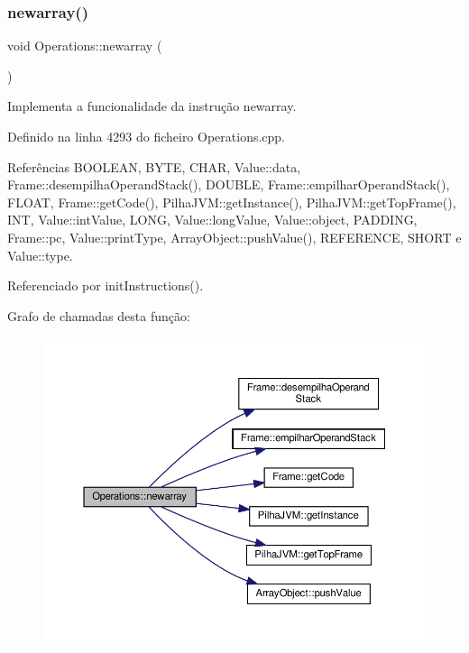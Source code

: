 \subsubsection{\texorpdfstring{newarray()}{newarray()}}
{\footnotesize\ttfamily void Operations\+::newarray (\begin{DoxyParamCaption}{ }\end{DoxyParamCaption})\hspace{0.3cm}{\ttfamily [private]}}



Implementa a funcionalidade da instrução newarray. 



Definido na linha 4293 do ficheiro Operations.\+cpp.



Referências B\+O\+O\+L\+E\+AN, B\+Y\+TE, C\+H\+AR, Value\+::data, Frame\+::desempilha\+Operand\+Stack(), D\+O\+U\+B\+LE, Frame\+::empilhar\+Operand\+Stack(), F\+L\+O\+AT, Frame\+::get\+Code(), Pilha\+J\+V\+M\+::get\+Instance(), Pilha\+J\+V\+M\+::get\+Top\+Frame(), I\+NT, Value\+::int\+Value, L\+O\+NG, Value\+::long\+Value, Value\+::object, P\+A\+D\+D\+I\+NG, Frame\+::pc, Value\+::print\+Type, Array\+Object\+::push\+Value(), R\+E\+F\+E\+R\+E\+N\+CE, S\+H\+O\+RT e Value\+::type.



Referenciado por init\+Instructions().

Grafo de chamadas desta função\+:
\nopagebreak
\begin{figure}[H]
\begin{center}
\leavevmode
\includegraphics[width=350pt]{classOperations_a3537f097b63240202ac0c9249dda33a9_cgraph}
\end{center}
\end{figure}
\mbox{\label{classOperations_a3426eecc1b88f11cc8317f99d430a201}} 
